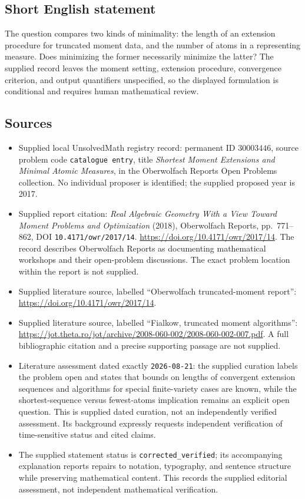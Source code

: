 \documentclass[11pt]{article}
\begin{document}
\subsection{Short English statement}
The question compares two kinds of minimality: the length of an extension procedure for truncated moment data, and the number of atoms in a representing measure. Does minimizing the former necessarily minimize the latter? The supplied record leaves the moment setting, extension procedure, convergence criterion, and output quantifiers unspecified, so the displayed formulation is conditional and requires human mathematical review.
\subsection{Sources}
\begin{itemize}
\item Supplied local UnsolvedMath registry record: permanent ID \(30003446\), source problem code \texttt{catalogue entry}, title \emph{Shortest Moment Extensions and Minimal Atomic Measures}, in the Oberwolfach Reports Open Problems collection. No individual proposer is identified; the supplied proposed year is 2017.
\item Supplied report citation: \emph{Real Algebraic Geometry With a View Toward Moment Problems and Optimization} (2018), Oberwolfach Reports, pp.\ 771--862, DOI \texttt{10.4171/owr/2017/14}. \url{https://doi.org/10.4171/owr/2017/14}. The record describes Oberwolfach Reports as documenting mathematical workshops and their open-problem discussions. The exact problem location within the report is not supplied.
\item Supplied literature source, labelled ``Oberwolfach truncated-moment report'': \url{https://doi.org/10.4171/owr/2017/14}.
\item Supplied literature source, labelled ``Fialkow, truncated moment algorithms'': \url{https://jot.theta.ro/jot/archive/2008-060-002/2008-060-002-007.pdf}. A full bibliographic citation and a precise supporting passage are not supplied.
\item Literature assessment dated exactly \texttt{2026-08-21}: the supplied curation labels the problem open and states that bounds on lengths of convergent extension sequences and algorithms for special finite-variety cases are known, while the shortest-sequence versus fewest-atoms implication remains an explicit open question. This is supplied dated curation, not an independently verified assessment. Its background expressly requests independent verification of time-sensitive status and cited claims.
\item The supplied statement status is \texttt{corrected\_verified}; its accompanying explanation reports repairs to notation, typography, and sentence structure while preserving mathematical content. This records the supplied editorial assessment, not independent mathematical verification.
\end{itemize}
\end{document}
